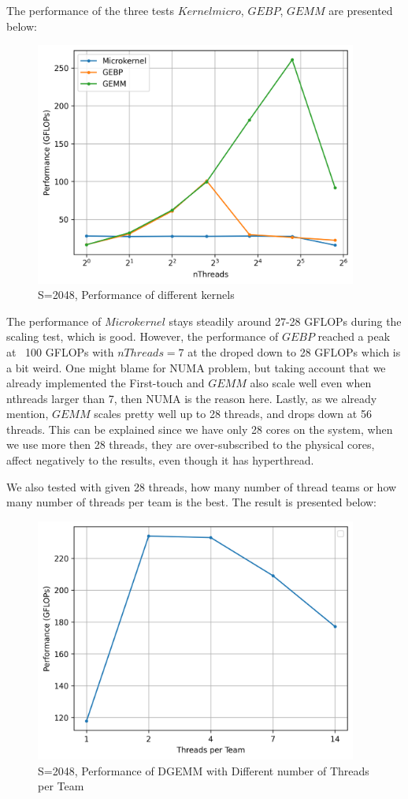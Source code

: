 \documentclass[article]{scrartcl}
\begin{document}
The performance of the three tests $Kernelmicro$, $GEBP$, $GEMM$ are presented below:
\begin{figure}[htpb]
    \centering
    \includegraphics[width=\textwidth,height=8cm,keepaspectratio=true]{../figs/4.1_differenceTests.png}
    \caption{S=2048, Performance of different kernels}
    \label{fig:dgemm1}
\end{figure}
The performance of $Microkernel$ stays steadily around 27-28 GFLOPs during the scaling test, which is good. However, the performance of $GEBP$ reached a peak at ~100 GFLOPs with $nThreads=7$ at the droped down to 28 GFLOPs which is a bit weird. One might blame for NUMA problem, but taking account that we already implemented the First-touch and $GEMM$ also scale well even when nthreads larger than 7, then NUMA is the reason here. Lastly, as we already mention, $GEMM$ scales pretty well up to 28 threads, and drops down at 56 threads. This can be explained since we have only 28 cores on the system, when we use more then 28 threads, they are over-subscribed to the physical cores, affect negatively to the results, even though it has hyperthread.


We also tested with given 28 threads, how many number of thread teams or how many number of threads per team is the best. The result is presented below:
\begin{figure}[htpb]
    \centering
    \includegraphics[width=\textwidth,height=8cm,keepaspectratio=true]{../figs/4.ThreadsPerTeam.png}
    \caption{S=2048, Performance of DGEMM with Different number of Threads per Team}
    \label{fig:dgemm2}
\end{figure}
\end{document}
